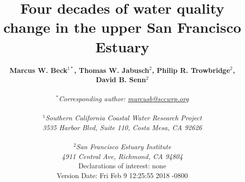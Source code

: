 \documentclass[letterpaper,12pt,oneside]{article}\usepackage[]{graphicx}\usepackage[]{color}
\begin{document}
\raggedbottom
\linenumbers
\raggedright
{}
\setlength{\parindent}{0.5in}
\renewcommand\refname{References \vspace{12pt}}

\begin{singlespace}
\title{{\bf {\Large Four decades of water quality change in the upper San Francisco Estuary}}}
\author{
  {\bf {\normalsize Marcus W. Beck$^{1*}$, Thomas W. Jabusch$^2$, Philip R. Trowbridge$^2$, David B. Senn$^2$}}
  \\\\{\textit {\normalsize $^*$Corresponding author: \href{mailto:marcusb@sccwrp.org}{marcusb@sccwrp.org}}}
  \\\\{\textit {\normalsize $^1$Southern California Coastal Water Research Project}}
  \\{\textit {\normalsize 3535 Harbor Blvd, Suite 110, Costa Mesa, CA 92626}}
  \\\\{\textit {\normalsize $^2$San Francisco Estuary Institute}}
	\\{\textit {\normalsize 4911 Central Ave, Richmond, CA 94804}}
  \vspace{1in}
  \\{Declarations of interest: none}
  \vspace{0.1in}
  \\ Version Date:   Fri Feb 9 12:25:55 2018 -0800
	}
\date{}
\maketitle
\end{singlespace}
\clearpage
\end{document}
